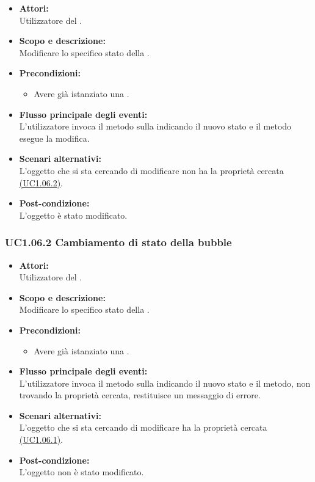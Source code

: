 \begin{itemize}
	\item \textbf{Attori:}
	\\Utilizzatore del .
	\item \textbf{Scopo e descrizione:} 
	\\Modificare lo specifico stato della .
	\item \textbf{Precondizioni:}
	\begin{itemize}
		\item Avere già istanziato una .
	\end{itemize}
	\item \textbf{Flusso principale degli eventi:}
	\\L'utilizzatore invoca il metodo sulla  indicando il nuovo stato e il metodo esegue la modifica.
	\item \textbf{Scenari alternativi:}
	\\L'oggetto che si sta cercando di modificare non ha la proprietà cercata \hyperref[UC1.06.2]{(UC1.06.2)}.
	\item \textbf{Post-condizione:}
	\\L'oggetto è stato modificato.
\end{itemize}

\subsubsection{UC1.06.2 Cambiamento di stato della bubble} \label{UC1.06.2}

\begin{itemize}
	\item \textbf{Attori:}
	\\Utilizzatore del .
	\item \textbf{Scopo e descrizione:} 
	\\Modificare lo specifico stato della .
	\item \textbf{Precondizioni:}
	\begin{itemize}
		\item Avere già istanziato una .
	\end{itemize}
	\item \textbf{Flusso principale degli eventi:}
	\\L'utilizzatore invoca il metodo sulla  indicando il nuovo stato e il metodo, non trovando la proprietà cercata, restituisce un messaggio di errore.
	\item \textbf{Scenari alternativi:}
	\\L'oggetto che si sta cercando di modificare ha la proprietà cercata \hyperref[UC1.06.1]{(UC1.06.1)}.
	\item \textbf{Post-condizione:}
	\\L'oggetto non è stato modificato.
\end{itemize}

